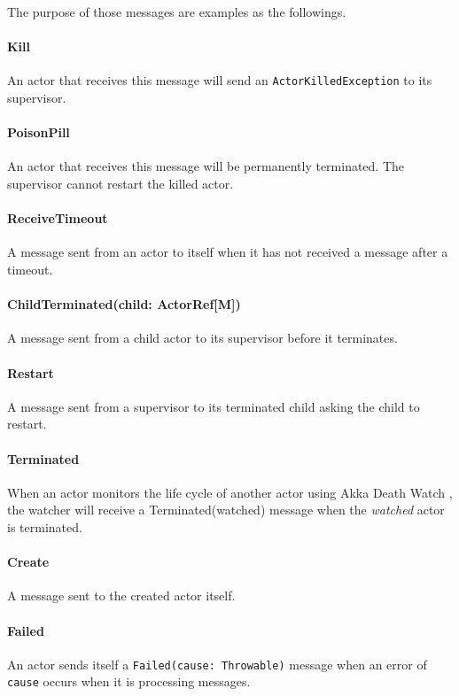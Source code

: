 The purpose of those messages are examples as the followings.

\paragraph{Kill}   An actor that receives this message will send an {\tt ActorKilledException} 
to its supervisor.

\paragraph{PoisonPill}  An actor that receives this message will be permanently terminated.  The
supervisor cannot restart the killed actor.

\paragraph{ReceiveTimeout}  A message sent from an actor to itself when it has not received a message
after a timeout.

\paragraph{ChildTerminated(child: ActorRef[M])}  A message sent from a child actor to its supervisor before it terminates.
  
\paragraph{Restart}A message sent from a supervisor to its terminated child asking the
child to restart.

\paragraph{Terminated}  When an actor monitors the life cycle of another actor using Akka Death 
Watch \citep[Section 3.1]{akka_doc}, the watcher will receive a 
Terminated(watched) message when the {\it watched} actor is terminated.

\paragraph{Create} A message sent to the created actor itself.
  
\paragraph{Failed}  An actor sends itself a {\tt Failed(cause: Throwable)} message when an error 
of {\tt cause} occurs when it is processing messages.
  
